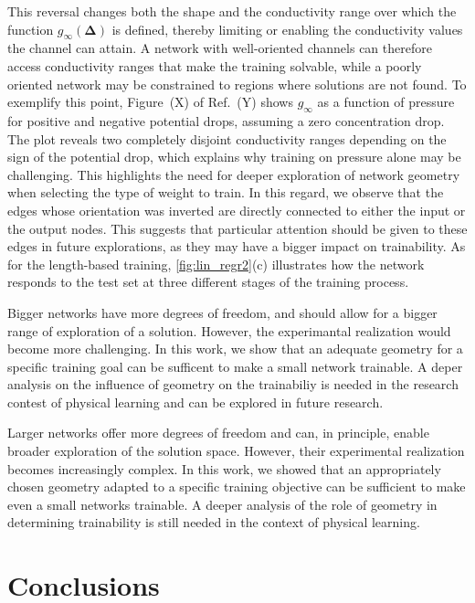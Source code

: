 \documentclass[reprint,superscriptaddress,prb,showkeys]{revtex4-2}
\begin{document}
This reversal changes both the shape and the conductivity range over which the function $g_{\infty}(\boldsymbol{\Delta})$ is defined, thereby limiting or enabling the conductivity values the channel can attain. A network with well-oriented channels can therefore access conductivity ranges that make the training solvable, while a poorly oriented network may be constrained to regions where solutions are not found. To exemplify this point, Figure~(X) of Ref.~(Y) shows $g_{\infty}$ as a function of pressure for positive and negative potential drops, assuming a zero concentration drop. The plot reveals two completely disjoint conductivity ranges depending on the sign of the potential drop, which explains why training on pressure alone may be challenging. This highlights the need for deeper exploration of network geometry when selecting the type of weight to train. In this regard, we observe that the edges whose orientation was inverted are directly connected to either the input or the output nodes. This suggests that particular attention should be given to these edges in future explorations, as they may have a bigger impact on trainability.
As for the length-based training, \cref{fig:lin_regr2}(c) illustrates how the network responds to the test set at three different stages of the training process.

Bigger networks have more degrees of freedom, and should allow for a bigger range of exploration of a solution. However, the experimantal realization would become more challenging. In this work, we show that an adequate geometry for a specific training goal can be sufficent to make a small network trainable. A deper analysis on the influence of geometry on the trainabiliy is needed in the research contest of physical learning and can be explored in future research.

Larger networks offer more degrees of freedom and can, in principle, enable broader exploration of the solution space. However, their experimental realization becomes increasingly complex. In this work, we showed that an appropriately chosen geometry adapted to a specific training objective can be sufficient to make even a small networks trainable. A deeper analysis of the role of geometry in determining trainability is still needed in the context of physical learning.

\section{Conclusions}
\end{document}
